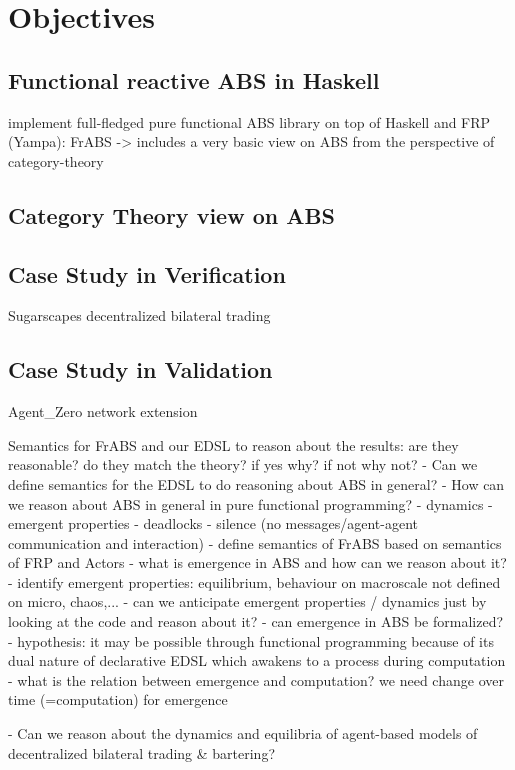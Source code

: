 \section{Objectives}
\subsection{Functional reactive ABS in Haskell}
implement full-fledged pure functional ABS library on top of Haskell and FRP (Yampa): FrABS
	-> includes a very basic view on ABS from the perspective of category-theory
	
\subsection{Category Theory view on ABS}

\subsection{Case Study in Verification}
Sugarscapes decentralized  bilateral trading 

\subsection{Case Study in Validation}
Agent\_Zero network extension

Semantics for FrABS and our EDSL to reason about the results: are they reasonable? do they match the theory? if yes why? if not why not?
	- Can we define semantics for the EDSL to do reasoning about ABS in general?
	- How can we reason about ABS in general in pure functional programming?
		- dynamics
		- emergent properties
		- deadlocks
		- silence (no messages/agent-agent communication and interaction)
		- define semantics of FrABS based on semantics of FRP and Actors
		- what is emergence in ABS and how can we reason about it? 
			- identify emergent properties: equilibrium, behaviour on macroscale not defined on micro, chaos,...
			- can we anticipate emergent properties / dynamics just by looking at the code and reason about it?
			- can emergence in ABS be formalized?
				- hypothesis: it may be possible through functional programming because of its dual nature of declarative EDSL which awakens to a process during computation
					- what is the relation between emergence and computation? we need change over time (=computation) for emergence
					
		- Can we reason about the dynamics and equilibria of agent-based models of decentralized bilateral trading \& bartering?